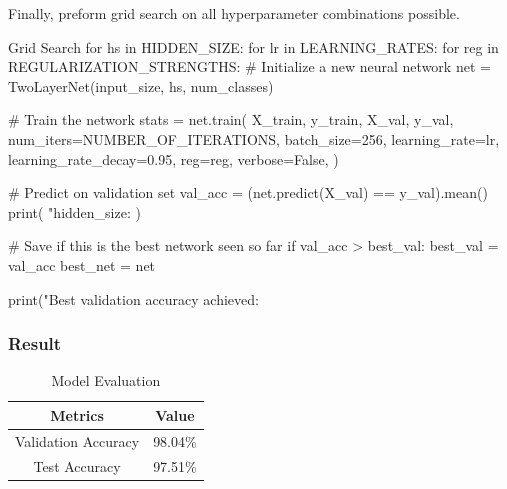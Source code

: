 \documentclass[12pt, a4paper]{article}
\begin{document}
                Finally, preform grid search on all hyperparameter combinations possible.
                \begin{codeblock}{Grid Search}
                    for hs in HIDDEN_SIZE:
                        for lr in LEARNING_RATES:
                            for reg in REGULARIZATION_STRENGTHS:
                                # Initialize a new neural network
                                net = TwoLayerNet(input_size, hs, num_classes)

                                # Train the network
                                stats = net.train(
                                    X_train,
                                    y_train,
                                    X_val,
                                    y_val,
                                    num_iters=NUMBER_OF_ITERATIONS,
                                    batch_size=256,
                                    learning_rate=lr,
                                    learning_rate_decay=0.95,
                                    reg=reg,
                                    verbose=False,
                                )

                                # Predict on validation set
                                val_acc = (net.predict(X_val) == y_val).mean()
                                print(
                                    "hidden_size: %
                                )

                                # Save if this is the best network seen so far
                                if val_acc > best_val:
                                    best_val = val_acc
                                    best_net = net

                    print("Best validation accuracy achieved: %
                \end{codeblock}

            \subsubsection{Result}
                \begin{table}[h]
                    \centering
                    \begin{tabular}{|c|c|}
                        \hline
                        Metrics & Value \\
                        \hline \hline
                        Validation Accuracy & 98.04\% \\
                        Test Accuracy & 97.51\% \\
                        \hline
                    \end{tabular}
                    \caption{Model Evaluation}
                \end{table}
\end{document}
